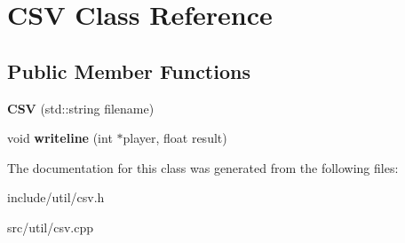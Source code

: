 \hypertarget{classCSV}{\section{C\-S\-V Class Reference}
\label{classCSV}
}
\subsection*{Public Member Functions}
\begin{DoxyCompactItemize}
\item 
\hypertarget{classCSV_abaeb26c9fa8a85305941468838f79f1d}{{\bfseries C\-S\-V} (std\-::string filename)}\label{classCSV_abaeb26c9fa8a85305941468838f79f1d}

\item 
\hypertarget{classCSV_a4478110e6b822b89dd8744cfbbc29914}{void {\bfseries writeline} (int $\ast$player, float result)}\label{classCSV_a4478110e6b822b89dd8744cfbbc29914}

\end{DoxyCompactItemize}


The documentation for this class was generated from the following files\-:\begin{DoxyCompactItemize}
\item 
include/util/csv.\-h\item 
src/util/csv.\-cpp\end{DoxyCompactItemize}
